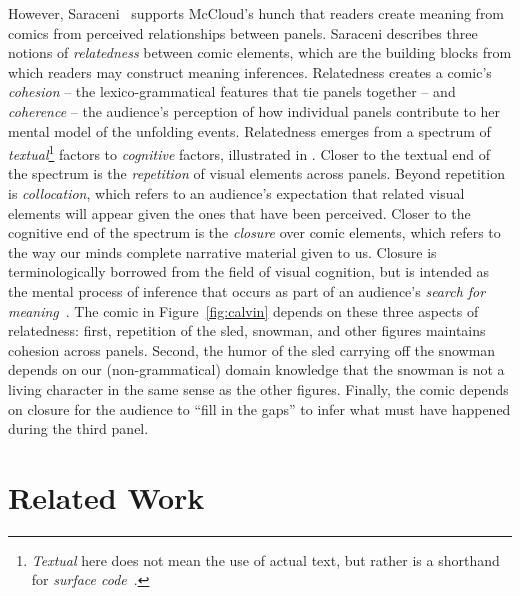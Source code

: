 However, Saraceni~\cite{saraceni2016relatedness} supports
McCloud's hunch that readers create meaning from comics from perceived
relationships between panels.  Saraceni describes three notions of
\emph{relatedness} between comic elements, which are the building blocks
from which readers may construct meaning inferences.  
Relatedness creates  a comic's \emph{cohesion} -- the lexico-grammatical
features that tie panels together -- and \emph{coherence} -- the audience's
perception of how individual panels contribute to her mental model of the
unfolding events. Relatedness emerges from a spectrum of
\emph{textual}\footnote{\emph{Textual} here does not mean the use of actual
text, but rather is a shorthand for \emph{surface
code}~\cite{zwaan1998situation}.} factors to \emph{cognitive} factors,
illustrated in .
%
Closer to the textual end of the spectrum is the \emph{repetition} of
visual elements across panels. Beyond repetition is \emph{collocation},
which refers to an audience's expectation that related visual elements will
appear given the ones that have been perceived. Closer to the cognitive end
of the spectrum is the \emph{closure} over comic elements, which refers to
the way our minds complete narrative material given to us. Closure is
terminologically borrowed from the field of visual cognition, but is
intended as the mental process of inference that occurs as part of an
audience's \emph{search for meaning}~\cite{gerrig1994readers}.
%
The comic in Figure~\ref{fig:calvin} depends on these three 
aspects of relatedness: first, repetition of the sled, snowman, and other
figures maintains cohesion across panels. Second, the humor of the sled
carrying off the snowman depends on our (non-grammatical) domain knowledge
that the snowman is not a living character in the same sense as the other
figures. Finally, the comic depends on closure for the audience to ``fill
in the gaps'' to infer what must have happened during the third panel.

\section{Related Work}

